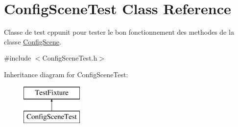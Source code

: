 \hypertarget{class_config_scene_test}{\section{Config\-Scene\-Test Class Reference}
\label{class_config_scene_test}
}


Classe de test cppunit pour tester le bon fonctionnement des methodes de la classe \hyperlink{class_config_scene}{Config\-Scene}.  




{\ttfamily \#include $<$Config\-Scene\-Test.\-h$>$}

Inheritance diagram for Config\-Scene\-Test\-:\begin{figure}[H]
\begin{center}
\leavevmode
\includegraphics[height=2.000000cm]{class_config_scene_test}
\end{center}
\end{figure}
